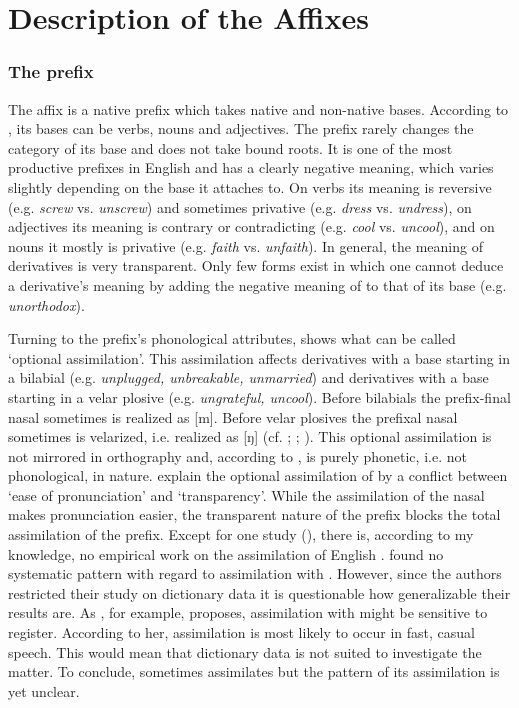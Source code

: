 \section{Description of the Affixes}

\subsubsection{The prefix } {\label{description un}}

The affix  is a native prefix which takes native and non-native bases. According to \citet[ 355, 361, 371 ff]{Bauer.2013}, its bases can be verbs, nouns and adjectives. The prefix rarely changes the category of its base and does not take bound roots. It is one of the most productive prefixes in English and has a clearly negative meaning, which varies slightly depending on the base it attaches to. On verbs its meaning is reversive (e.g. \textit{screw} vs. \textit{unscrew}) and sometimes privative (e.g. \textit{dress} vs. \textit{undress}), on adjectives its meaning is contrary or contradicting (e.g. \textit{cool} vs. \textit{uncool}), and on nouns it mostly is privative (e.g. \textit{faith} vs. \textit{unfaith}).
In general, the meaning of derivatives is very transparent. Only few forms exist in which one cannot deduce a derivative's meaning by adding the negative meaning of  to that of its base (e.g. \textit{unorthodox}).

Turning to the prefix's phonological attributes,  shows what can be called `optional assimilation'. This assimilation affects derivatives with a base starting in a bilabial (e.g. \textit{unplugged, unbreakable, unmarried}) and derivatives with a base starting in a velar plosive (e.g. \textit{ungrateful, uncool}).
Before bilabials the prefix-final nasal sometimes is realized as [m]. Before velar plosives the prefixal nasal sometimes is velarized, i.e. realized as [ŋ] (cf. \citealt[5 f]{Hanote.2010}; \citealt[180]{Bauer.2013}; \citealt[125]{Okada.2013}). 
This optional assimilation is not mirrored in orthography and, according to \citet[125]{Okada.2013}, is purely phonetic, i.e. not phonological, in nature. \citet[87 f]{Stockwell.2001} explain the optional assimilation of  by a conflict between `ease of pronunciation' and `transparency'. While the assimilation of the nasal makes pronunciation easier, the transparent nature of the prefix blocks the total assimilation of the prefix.
Except for one study (\citealt{Hanote.2010}), there is, according to my knowledge, no empirical work on the assimilation of English . \cite{Hanote.2010} found no systematic pattern with regard to assimilation with . However, since the authors restricted their study on dictionary data it is questionable how generalizable their results are.  
As \citet[138]{Raffelsiefen.1999}, for example, proposes, assimilation with  might be sensitive to register.  According to her,  assimilation is most likely to occur in fast, casual speech. This would mean that dictionary data is not suited to investigate the matter.
To conclude,  sometimes assimilates but the pattern of its assimilation is yet unclear.




